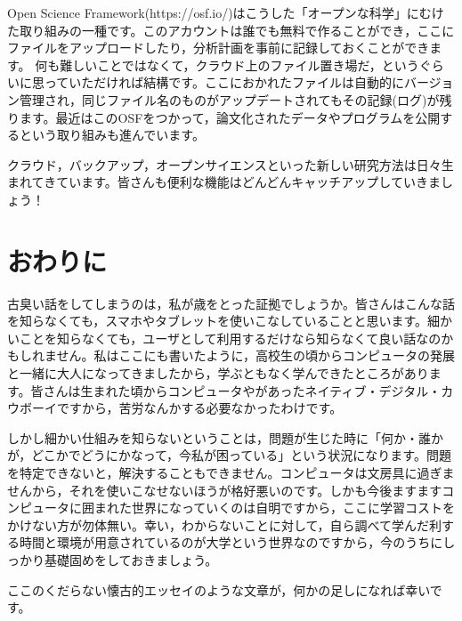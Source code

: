 \documentclass{ltjsbook}
\begin{document}
Open Science Framework(https://osf.io/)はこうした「オープンな科学」にむけた取り組みの一種です。このアカウントは誰でも無料で作ることができ，ここにファイルをアップロードしたり，分析計画を事前に記録しておくことができます。
何も難しいことではなくて，クラウド上のファイル置き場だ，というぐらいに思っていただければ結構です。ここにおかれたファイルは自動的にバージョン管理され，同じファイル名のものがアップデートされてもその記録(ログ)が残ります。最近はこのOSFをつかって，論文化されたデータやプログラムを公開するという取り組みも進んでいます。

クラウド，バックアップ，オープンサイエンスといった新しい研究方法は日々生まれてきています。皆さんも便利な機能はどんどんキャッチアップしていきましょう！


\section{おわりに}
古臭い話をしてしまうのは，私が歳をとった証拠でしょうか。皆さんはこんな話を知らなくても，スマホやタブレットを使いこなしていることと思います。細かいことを知らなくても，ユーザとして利用するだけなら知らなくて良い話なのかもしれません。私はここにも書いたように，高校生の頃からコンピュータの発展と一緒に大人になってきましたから，学ぶともなく学んできたところがあります。皆さんは生まれた頃からコンピュータやがあったネイティブ・デジタル・カウボーイですから，苦労なんかする必要なかったわけです。

しかし細かい仕組みを知らないということは，問題が生じた時に「何か・誰かが，どこかでどうにかなって，今私が困っている」という状況になります。問題を特定できないと，解決することもできません。コンピュータは文房具に過ぎませんから，それを使いこなせないほうが格好悪いのです。しかも今後ますますコンピュータに囲まれた世界になっていくのは自明ですから，ここに学習コストをかけない方が勿体無い。幸い，わからないことに対して，自ら調べて学んだ利する時間と環境が用意されているのが大学という世界なのですから，今のうちにしっかり基礎固めをしておきましょう。

ここのくだらない懐古的エッセイのような文章が，何かの足しになれば幸いです。
\end{document}
